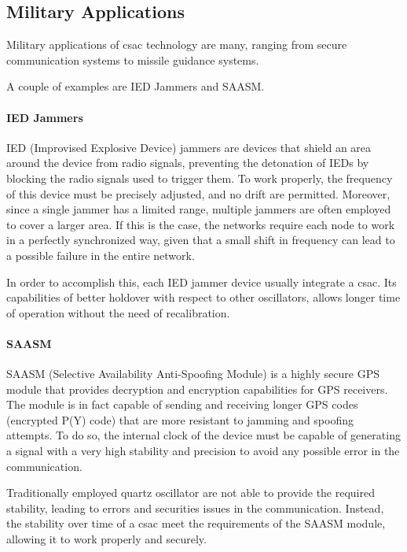 \subsection{Military Applications}
\label{subsec:military}

Military applications of \acrshort{csac} technology are many, ranging from secure communication systems to missile guidance systems.

A couple of examples are IED Jammers and SAASM.


\paragraph{IED Jammers}

IED (Improvised Explosive Device) jammers are devices that shield an area around the device from radio signals, preventing the detonation of IEDs by blocking the radio signals used to trigger them.
To work properly, the frequency of this device must be precisely adjusted, and no drift are permitted.
Moreover, since a single jammer has a limited range, multiple jammers are often employed to cover a larger area.
If this is the case, the networks require each node to work in a perfectly synchronized way, given that a small shift in frequency can lead to a possible failure in the entire network.

In order to accomplish this, each IED jammer device usually integrate a \acrshort{csac}.
Its capabilities of better holdover with respect to other oscillators, allows longer time of operation without the need of recalibration.


\paragraph{SAASM}

SAASM (Selective Availability Anti-Spoofing Module) is a highly secure GPS module that provides decryption and encryption capabilities for GPS receivers.
The module is in fact capable of sending and receiving longer GPS codes (encrypted P(Y) code) that are more resistant to jamming and spoofing attempts.
To do so, the internal clock of the device must be capable of generating a signal with a very high stability and precision to avoid any possible error in the communication.

Traditionally employed quartz oscillator are not able to provide the required stability, leading to errors and securities issues in the communication.
Instead, the stability over time of a \acrshort{csac} meet the requirements of the SAASM module, allowing it to work properly and securely.
